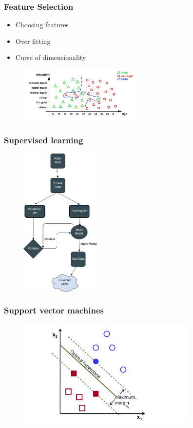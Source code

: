 \documentclass{beamer}
\begin{document}

\begin{frame}
\frametitle{Feature Selection}
\begin{itemize}
	\item Choosing features
	\item Over fitting 
	\item Curse of dimensionality
\end{itemize}
\begin{figure}
	\centering
    \includegraphics[width=60mm,scale=1.5]{./img/overfit.png}
\end{figure}
\end{frame}

\begin{frame}
\frametitle{Supervised learning}

\begin{figure}
	\centering
    \includegraphics[width=40mm,scale=1]{./img/SL.png}
\end{figure}

\end{frame}


\begin{frame}
\frametitle{Support vector machines}
\begin{figure}
	\centering
    \includegraphics[width=90mm,scale=1]{./img/SVM.png}
\end{figure}

\end{frame}
\end{document}
